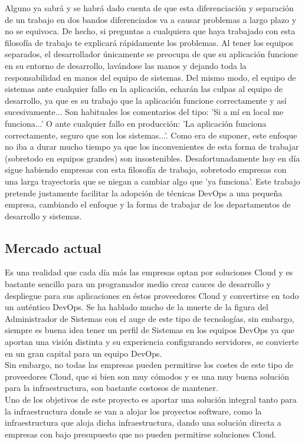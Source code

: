 \begin{text}
		Alguno ya sabrá y se habrá dado cuenta de que esta diferenciación y separación de un trabajo en dos bandos diferenciados va a causar problemas a largo plazo y no se equivoca. De hecho, si preguntas a cualquiera que haya trabajado con esta filosofía de trabajo te explicará rápidamente los problemas. Al tener los equipos separados, el desarrollador únicamente se preocupa de que su aplicación funcione en su entorno de desarrollo, lavándose las manos y dejando toda la responsabilidad en manos del equipo de sistemas. Del mismo modo, el equipo de sistemas ante cualquier fallo en la aplicación, echarán las culpas al equipo de desarrollo, ya que es su trabajo que la aplicación funcione correctamente y así sucesivamente... Son habituales los comentarios del tipo: 'Si a mí en local me funciona...' O ante cualquier fallo en producción: 'La aplicación funciona correctamente, seguro que son los sistemas...'. Como era de suponer, este enfoque no iba a durar mucho tiempo ya que los inconvenientes de esta forma de trabajar (sobretodo en equipos grandes) son insostenibles. Desafortunadamente hoy en día sigue habiendo empresas con esta filosofía de trabajo, sobretodo empresas con una larga trayectoria que se niegan a cambiar algo que 'ya funciona'. Este trabajo pretende justamente facilitar la adopción de técnicas DevOps a una pequeña empresa, cambiando el enfoque y la forma de trabajar de los departamentos de desarrollo y sistemas.
	\end{text}
	
	\subsection{Mercado actual}
		\begin{text}
			Es una realidad que cada día más las empresas optan por soluciones Cloud y es bastante sencillo para un programador medio crear cauces de desarrollo y despliegue para sus aplicaciones en éstos proveedores Cloud y convertirse en todo un auténtico DevOps. Se ha hablado mucho de la muerte de la figura del Administrador de Sistemas con el auge de este tipo de tecnologías, sin embargo, siempre es buena idea tener un perfil de Sistemas en los equipos DevOps ya que aportan una visión distinta y su experiencia configurando servidores, se convierte en un gran capital para un equipo DevOps. \\ 
			Sin embargo, no todas las empresas pueden permitirse los costes de este tipo de proveedores Cloud, que si bien son muy cómodos y es una muy buena solución para la infraestructura, son bastante costosos de mantener. \\
			Uno de los objetivos de este proyecto es aportar una solución integral tanto para la infraestructura donde se van a alojar los proyectos software, como la infraestructura que aloja dicha infraestructura, dando una solución directa a empresas con bajo presupuesto que no pueden permitirse soluciones Cloud. \\
		\end{text}
	\clearpage
	
